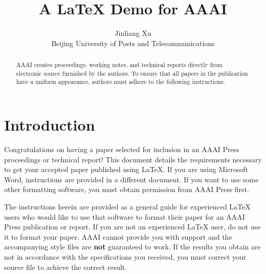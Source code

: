 \documentclass[letterpaper]{article}
\theoremstyle{definition}
\begin{document}
%
\title{A LaTeX Demo for AAAI}
\author{Jinliang Xu\\
Beijing University of Posts and Telecommunications\\
}
\maketitle
\begin{abstract}
AAAI creates proceedings, working notes, and technical reports directly from electronic source furnished by the authors. To ensure that all papers in the publication have a uniform appearance, authors must adhere to the following instructions.
\end{abstract}

\section{Introduction}
\noindent Congratulations on having a paper selected for inclusion in an AAAI Press proceedings or technical report! This document details the requirements necessary to get your accepted paper published using \LaTeX{}. If you are using Microsoft Word, instructions are provided in a different document. If you want to use some other formatting software, you must obtain permission from AAAI Press first.

The instructions herein are provided as a general guide for experienced \LaTeX{} users who would like to use that software to format their paper for an AAAI Press publication or report. If you are not an experienced \LaTeX{} user, do not use it to format your paper. AAAI cannot provide you with support and the accompanying style files are \textbf{not} guaranteed to work. If the results you obtain are not in accordance with the specifications you received, you must correct your source file to achieve the correct result.
\end{document}
